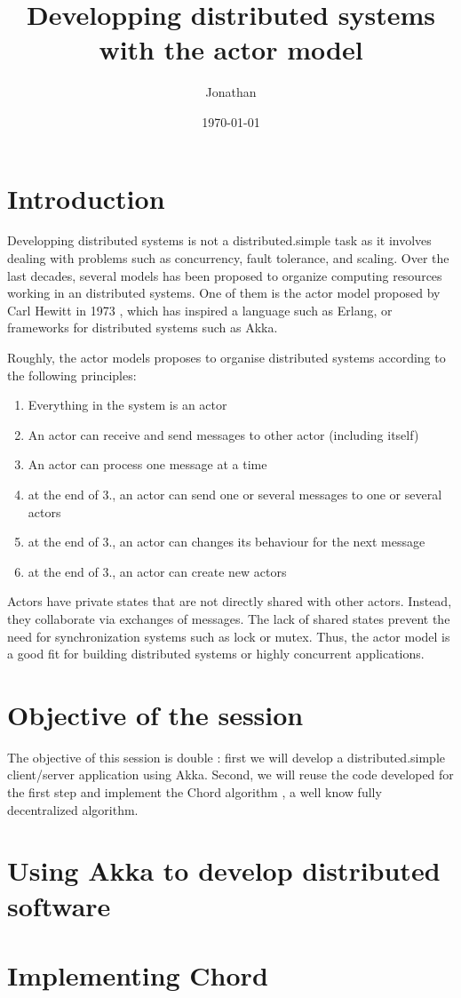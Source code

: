 \documentclass[11pt]{article}
\author{Jonathan}
\date{\today}
\title{Developping distributed systems with the actor model}
\begin{document}
\maketitle
\tableofcontents


\section{Introduction}
\label{sec-1}

Developping distributed systems is not a distributed.simple task as it involves
dealing with problems such as concurrency, fault tolerance, and
scaling. Over the last decades, several models has been proposed to
organize computing resources working in an distributed systems. One of
them is the actor model proposed by Carl Hewitt in 1973
\cite{hewitt1973session}, which has inspired a language such as Erlang,
or frameworks for distributed systems such as Akka.

Roughly, the actor models proposes to organise distributed systems
according to the following principles:

\begin{enumerate}
\item Everything in the system is an actor
\item An actor can receive and send messages to other actor (including itself)
\item An actor can process one message at a time
\item at the end of 3., an actor can send one or several messages to one or several actors
\item at the end of 3., an actor can changes its behaviour for the next message
\item at the end of 3., an actor can create new actors
\end{enumerate}

Actors have private states that are not directly shared with other
actors. Instead, they collaborate via exchanges of messages. The lack
of shared states prevent the need for synchronization systems such as
lock or mutex. Thus, the actor model is a good fit for building
distributed systems or highly concurrent applications.

\section{Objective of the session}
\label{sec-2}

The objective of this session is double : first we will develop a
distributed.simple client/server application using Akka. Second, we will reuse the
code developed for the first step and implement the Chord algorithm
\cite{stoica2003chord}, a well know fully decentralized algorithm.

\section{Using Akka to develop distributed software}
\label{sec-3}
\section{Implementing Chord}
\label{sec-4}




\end{document}
